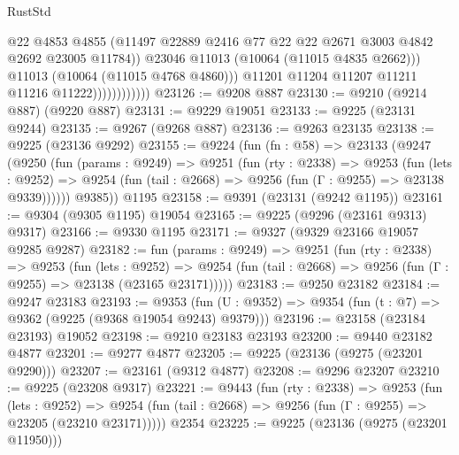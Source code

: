 \begin{lexlean}{RustStd}
\begin{coremodule}
                                  @22
                                  @4853
                                  @4855
                                  (@11497
                                    @22889
                                    @2416
                                    @77
                                    @22
                                    @22
                                    @2671
                                    @3003
                                    @4842
                                    @2692
                                    @23005
                                    @11784))
                                @23046
                                @11013
                                (@10064 (@11015 @4835 @2662)))
                              @11013
                              (@10064 (@11015 @4768 @4860)))
                            @11201
                            @11204
                            @11207
                            @11211
                            @11216
                            @11222))))))))))))
@23126 := @9208 @887
@23130 := @9210 (@9214 @887) (@9220 @887)
@23131 := @9229 @19051
@23133 := @9225 (@23131 @9244)
@23135 := @9267 (@9268 @887)
@23136 := @9263 @23135
@23138 := @9225 (@23136 @9292)
@23155 := @9224
    (fun (fn : @58) =>
    @23133
      (@9247
        (@9250
          (fun (params : @9249) =>
          @9251
            (fun (rty : @2338) =>
            @9253
              (fun (lets : @9252) =>
              @9254 (fun (tail : @2668) => @9256 (fun (Γ : @9255) => @23138 @9339))))))
        @9385))
    @1195
@23158 := @9391 (@23131 (@9242 @1195))
@23161 := @9304 (@9305 @1195) @19054
@23165 := @9225 (@9296 (@23161 @9313) @9317)
@23166 := @9330 @1195
@23171 := @9327 (@9329 @23166 @19057 @9285 @9287)
@23182 := fun (params : @9249) =>
  @9251
    (fun (rty : @2338) =>
    @9253
      (fun (lets : @9252) =>
      @9254 (fun (tail : @2668) => @9256 (fun (Γ : @9255) => @23138 (@23165 @23171)))))
@23183 := @9250 @23182
@23184 := @9247 @23183
@23193 := @9353
    (fun (U : @9352) => @9354 (fun (t : @7) => @9362 (@9225 (@9368 @19054 @9243) @9379)))
@23196 := @23158 (@23184 @23193) @19052
@23198 := @9210 @23183 @23193
@23200 := @9440 @23182 @4877
@23201 := @9277 @4877
@23205 := @9225 (@23136 (@9275 (@23201 @9290)))
@23207 := @23161 (@9312 @4877)
@23208 := @9296 @23207
@23210 := @9225 (@23208 @9317)
@23221 := @9443
    (fun (rty : @2338) =>
    @9253
      (fun (lets : @9252) =>
      @9254 (fun (tail : @2668) => @9256 (fun (Γ : @9255) => @23205 (@23210 @23171)))))
    @2354
@23225 := @9225 (@23136 (@9275 (@23201 @11950)))

\end{coremodule}
\end{lexlean}
